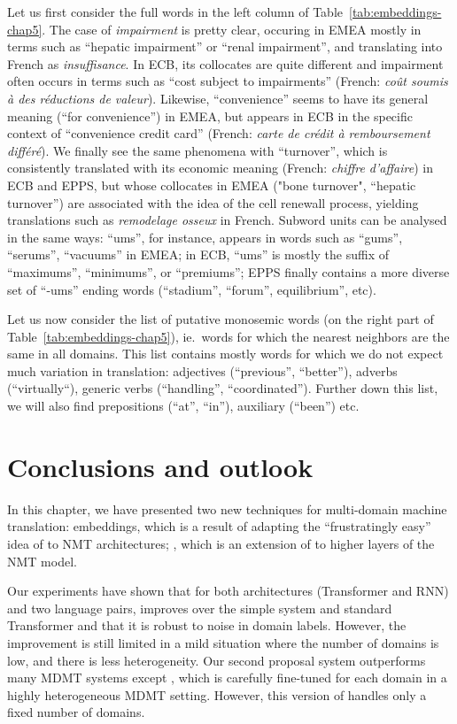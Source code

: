 Let us first consider the full words in the left column of Table~\ref{tab:embeddings-chap5}. The case of \emph{impairment} is pretty clear, occuring in EMEA mostly in terms such as ``hepatic impairment'' or ``renal impairment'', and translating into French as \textsl{insuffisance}. In ECB, its collocates are quite different and impairment often occurs in terms such as ``cost subject to impairments'' (French: \emph{co\^ut soumis \`a des r\'eductions de valeur}). Likewise, ``convenience'' seems to have its general meaning (``for convenience'') in EMEA, but appears in ECB in the specific context of ``convenience credit card'' (French: \textsl{carte de cr\' edit \`a remboursement diff\'er\'e}). We finally see the same phenomena with ``turnover'', which is consistently translated with its economic meaning (French: \textsl{chiffre d'affaire}) in ECB and EPPS, but whose collocates in EMEA ("bone turnover", ``hepatic turnover'') are associated with the idea of the cell renewall process, yielding translations such as \textsl{remodelage osseux} in French. Subword units can be analysed in the same ways: ``ums'', for instance, appears in words such as ``gums'', ``serums'', ``vacuums''  in EMEA; in ECB, ``ums'' is mostly the suffix of ``maximums'', ``minimums'', or ``premiums''; EPPS finally contains a more diverse set of ``-ums'' ending words (``stadium'', ``forum'', equilibrium'', etc). 

Let us now consider the list of putative monosemic words (on the right part of Table~\ref{tab:embeddings-chap5}), ie.\ words for which the nearest neighbors are the same in all domains. This list contains mostly words for which we do not expect much variation in translation: adjectives (``previous'', ``better''), adverbs (``virtually``), generic verbs (``handling'', ``coordinated''). Further down this list, we will also find prepositions (``at'', ``in''), auxiliary (``been'') etc.  

\section{Conclusions and outlook}
\label{sec:conclusion-chap5}
In this chapter, we have presented two new techniques for multi-domain machine translation:  embeddings, which is a result of adapting the ``frustratingly easy'' idea of \citet{Daume07frustratingly} to NMT architectures; , which is an extension of  to higher layers of the NMT model. 

Our experiments have shown that for both architectures (Transformer and RNN) and two language pairs,  improves over the simple  system and standard Transformer and that it is robust to noise in domain labels. However, the improvement is still limited in a mild situation where the number of domains is low, and there is less heterogeneity. Our second proposal system  outperforms many MDMT systems except , which is carefully fine-tuned for each domain in a highly heterogeneous MDMT setting. However, this version of  handles only a fixed number of domains.

